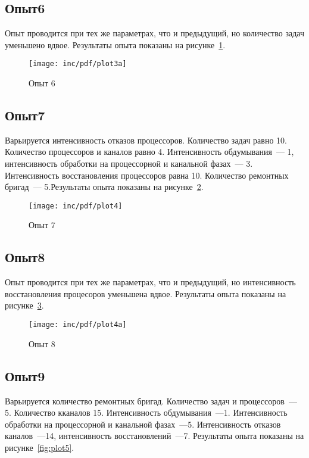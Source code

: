 \subsection*{Опыт6}

Опыт проводится при тех же параметрах, что и предыдущий, но количество задач уменьшено вдвое. Результаты опыта показаны на рисунке~\ref{fig:plot3a}.

\begin{figure}[ht!]
  \centering
  \texttt{[image: inc/pdf/plot3a]}
  \caption{Опыт 6}
  \label{fig:plot3a}
\end{figure}

\subsection*{Опыт7}

Варьируется интенсивность отказов процессоров. Количество задач равно 10. Количество процессоров и каналов равно 4. Интенсивность обдумывания~--- 1, интенсивность обработки на процессорной  и канальной фазах~--- 3. Интенсивность восстановления процессоров равна 10. Количество ремонтных бригад~--- 5.Результаты опыта показаны на рисунке~\ref{fig:plot4}.


\begin{figure}[ht!]
  \centering
  \texttt{[image: inc/pdf/plot4]}
  \caption{Опыт 7}
  \label{fig:plot4}
\end{figure}

\subsection*{Опыт8}

Опыт проводится при тех же параметрах, что и предыдущий, но интенсивность восстановления процесоров уменьшена вдвое. Результаты опыта показаны на рисунке~\ref{fig:plot4a}.

\begin{figure}[ht!]
  \centering
  \texttt{[image: inc/pdf/plot4a]}
  \caption{Опыт 8}
  \label{fig:plot4a}
\end{figure}

\subsection*{Опыт9}

Варьируется количество ремонтных бригад. Количество задач и процессоров~--- 5. Количество кканалов 15. Интенсивность обдумывания~---1. Интенсивность обработки на процессорной и канальной фазах~---5. Интенсивность отказов каналов~---14, интенсивность восстановлений~---7. Результаты опыта показаны на рисунке~\ref{fig:plot5}.

